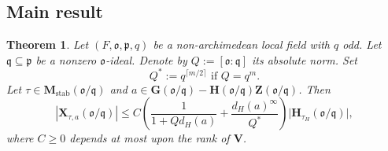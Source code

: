 \documentclass[reqno]{amsart}
\DeclareMathOperator{\stab}{stab}
\theoremstyle{plain} \newtheorem{theorem} {Theorem} \newtheorem{conjecture} {Conjecture} \newtheorem{corollary} [theorem] {Corollary} \newtheorem{proposition} [theorem] {Proposition} \newtheorem{fact} [theorem] {Fact}
\theoremstyle{definition} \newtheorem{definition} [theorem] {Definition}
\theoremstyle{itplain} %
\newcommand{\mfq}{\mathfrak{q}}
\begin{document}
\subsection{Main result}\label{sec:cj3v60wplb}

\begin{theorem}\label{theorem:volume-bound}
  Let $(F,\mathfrak{o},\mathfrak{p},q)$ be a non-archimedean local field with $q$ odd.  Let $\mfq \subseteq \mathfrak{p}$ be a nonzero $\mathfrak{o}$-ideal.  Denote by $Q := [\mathfrak{o}:\mfq]$ its absolute norm.  Set
  \begin{equation*}
    Q^* := q^{\lceil m/2 \rceil} \text{ if } Q = q^m.
  \end{equation*}
  Let $\tau \in \mathbf{M}_{\stab}(\mathfrak{o}/\mfq)$ and $a \in \mathbf{G}(\mathfrak{o}/\mfq) - \mathbf{H}(\mathfrak{o}/\mfq) \mathbf{Z}(\mathfrak{o}/\mfq)$.  Then
  \begin{equation*}
    \left\lvert \mathbf{X}_{\tau,a}(\mathfrak{o}/\mfq) \right\rvert
    \leq C \left( \frac{1}{1 + Q d_H(a)} + \frac{{d_H(a)}^\infty }{Q^{*}} \right) \lvert \mathbf{H}_{\tau_H}(\mathfrak{o}/\mfq) \rvert,
  \end{equation*}
  where $C \geq 0$ depends at most upon the rank of $\mathbf{V}$.
\end{theorem}
\end{document}
